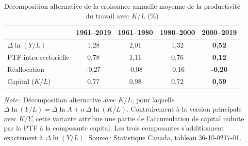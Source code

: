\begin{table}[tbp]
\centering
\sffamily
\renewcommand{\arraystretch}{1.3}
\begin{threeparttable}
\caption{D\'ecomposition alternative de la croissance annuelle moyenne de la productivit\'e du travail avec $K/L$ (\%)}
\label{tab:note_decomposition_kl}
\begin{tabular}{l*{4}{c}}
\toprule
& 1961--2019 & 1961--1980 & 1980--2000 & \textbf{2000--2019} \\
\midrule
$\Delta \ln(Y/L)$ & 1,28 & 2,01 & 1,32 & \textbf{0,52} \\
\quad PTF intra-sectorielle & 0,78 & 1,11 & 0,76 & \textbf{0,12} \\
\quad R\'eallocation & -0,27 & -0,08 & -0,16 & \textbf{-0,20} \\
\quad Capital ($K/L$) & 0,77 & 0,98 & 0,72 & \textbf{0,59} \\
\bottomrule
\end{tabular}
\begin{tablenotes}\footnotesize
\item \textit{Note}\,: D\'ecomposition alternative avec $K/L$, pour laquelle $\Delta \ln(Y/L) = \Delta \ln A + \bar\alpha\,\Delta \ln(K/L)$. Contrairement \`a la version principale avec $K/Y$, cette variante attribue une partie de l'accumulation de capital induite par la PTF \`a la composante capital. Les trois composantes s'additionnent exactement \`a $\Delta \ln(Y/L)$. Source\,: Statistique Canada, tableau 36-10-0217-01.
\end{tablenotes}
\end{threeparttable}
\end{table}